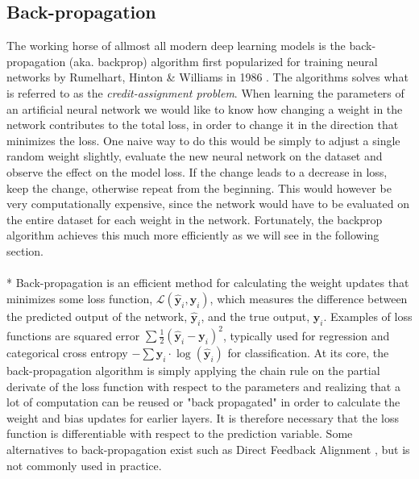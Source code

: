 \documentclass[a4paper,11pt]{article} %
\begin{document}
\subsection{Back-propagation}
\label{sec:backprop}
The working horse of allmost all modern deep learning models is the back-propagation (aka. backprop) algorithm first popularized for training neural networks by Rumelhart, Hinton \& Williams in 1986 \cite{rumelhart1986learning}. The algorithms solves what is referred to as the \textit{credit-assignment problem}. When learning the parameters of an artificial neural network we would like to know how changing a weight in the network contributes to the total loss, in order to change it in the direction that minimizes the loss. One naive way to do this would be simply to adjust a single random weight slightly, evaluate the new neural network on the dataset and observe the effect on the model loss. If the change leads to a decrease in loss, keep the change, otherwise repeat from the beginning. This would however be very computationally expensive, since the network would have to be evaluated on the entire dataset for each weight in the network. Fortunately, the backprop algorithm achieves this much more efficiently as we will see in the following section. \\
\\*
Back-propagation is an efficient method for calculating the weight updates that minimizes some loss function, $\mathcal{L}(\hat{\mathbf{y}}_i, \mathbf{y}_i)$, which measures the difference between the predicted output of the network, $\hat{\mathbf{y}}_i$, and the true output, $\mathbf{y}_i$. Examples of loss functions are squared error $\sum{\frac{1}{2}(\hat{\mathbf{y}}_i - \mathbf{y}_i)^2}$, typically used for regression and categorical cross entropy $-\sum{\mathbf{y}_i \cdot \log(\hat{\mathbf{y}}_i)}$ for classification. At its core, the back-propagation algorithm is simply applying the chain rule on the partial derivate of the loss function with respect to the parameters and realizing that a lot of computation can be reused or "back propagated" in order to calculate the weight and bias updates for earlier layers. It is therefore necessary that the loss function is differentiable with respect to the prediction variable. Some alternatives to back-propagation exist such as Direct Feedback Alignment \cite{noekland2016direct}, but is not commonly used in practice.  
\end{document}
